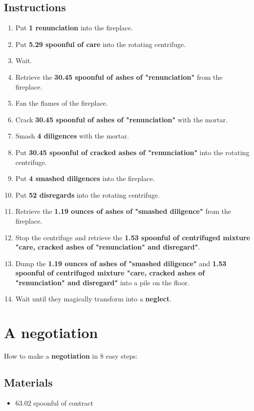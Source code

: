 \documentclass{article}
\begin{document}
\subsection{Instructions}\begin{enumerate}
\item 
Put \textbf{1 renunciation} into the fireplace.
\item 
Put \textbf{5.29 spoonful of care} into the rotating centrifuge.
\item 
Wait.
\item 
Retrieve the \textbf{30.45 spoonful of ashes of "renunciation"} from the fireplace.
\item 
Fan the flames of the fireplace.
\item 
Crack \textbf{30.45 spoonful of ashes of "renunciation"} with the mortar.
\item 
Smash \textbf{4 diligences} with the mortar.
\item 
Put \textbf{30.45 spoonful of cracked ashes of "renunciation"} into the rotating centrifuge.
\item 
Put \textbf{4 smashed diligences} into the fireplace.
\item 
Put \textbf{52 disregards} into the rotating centrifuge.
\item 
Retrieve the \textbf{1.19 ounces of ashes of "smashed diligence"} from the fireplace.
\item 
Stop the centrifuge and retrieve the \textbf{1.53 spoonful of centrifuged mixture "care, cracked ashes of "renunciation" and disregard"}.
\item 
Dump the \textbf{1.19 ounces of ashes of "smashed diligence"} and \textbf{1.53 spoonful of centrifuged mixture "care, cracked ashes of "renunciation" and disregard"} into a pile on the floor.
\item 
Wait until they magically transform into a \textbf{neglect}.
\end{enumerate}
\newpage
\section{A negotiation}How to make a \textbf{negotiation} in 8 easy steps:

\subsection{Materials}\begin{itemize}
\item 
63.02 spoonful of contract
\end{itemize}
\end{document}
